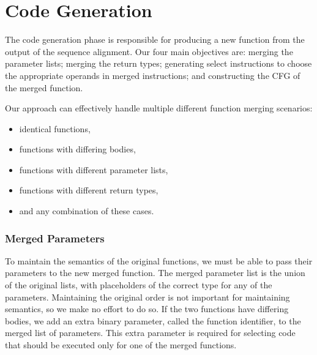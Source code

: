 



\section{Code Generation}
The code generation phase is responsible for producing a new function from the output of the sequence alignment.
Our four main objectives are: merging the parameter lists; merging the return types; generating select instructions to choose the appropriate
operands in merged instructions; and constructing the CFG of the merged function.

Our approach can effectively handle multiple different function merging scenarios:
\begin{itemize}
  \item identical functions,
  \item functions with differing bodies,
  \item functions with different parameter lists, 
  \item functions with different return types,
  \item and any combination of these cases.
\end{itemize}

\subsubsection{Merged Parameters}

To maintain the semantics of the original functions, we must be able to pass their parameters to
the new merged function. The merged parameter list is the union of the original lists, with
placeholders of the correct type for any of the parameters. Maintaining the original order is not
important for maintaining semantics, so we make no effort to do so.
If the two functions have differing bodies, we add an extra binary parameter, called the function
identifier, to the merged list of parameters. This extra parameter is required for selecting code
that should be executed only for one of the merged functions.

